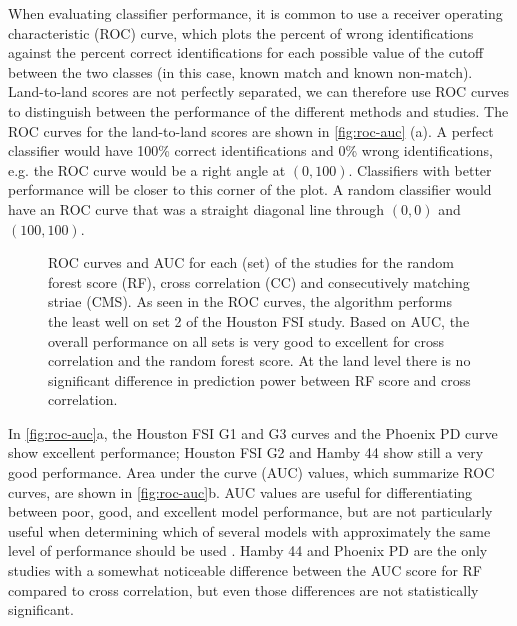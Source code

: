 \documentclass[doubleblind]{elsarticle}\usepackage[]{graphicx}\usepackage[]{color}
\newenvironment{knitrout}{}{} %
\begin{document}
When evaluating classifier performance, it is common to use a receiver operating characteristic (ROC) curve, which plots the percent of wrong identifications against the percent correct identifications for each possible value of the cutoff between the two classes (in this case, known match and known non-match). Land-to-land scores are not perfectly separated, we can therefore use ROC curves to distinguish between the performance of the different methods and studies. The ROC curves for the land-to-land scores are shown in \autoref{fig:roc-auc} (a). A perfect classifier would have 100\% correct identifications and 0\% wrong identifications, e.g. the ROC curve would be a right angle at $(0, 100)$. Classifiers with better performance will be closer to this corner of the plot. A random classifier would have an ROC curve that was a straight diagonal line through $(0,0)$ and $(100,100)$.










\begin{knitrout}
\color{fgcolor}\begin{figure}

{\centering {}

}

\caption[ROC curves and AUC for each (set) of the studies for the random forest score (RF), cross correlation (CC) and consecutively matching striae (CMS)]{ROC curves and AUC for each (set) of the studies for the random forest score (RF), cross correlation (CC) and consecutively matching striae (CMS).   As seen in the ROC curves, the algorithm performs the least well on set 2 of the Houston FSI study. Based on AUC, the overall performance on all sets is very good to excellent for cross correlation and the random forest score. At the land level there is no significant difference in prediction power between RF score and cross correlation.}\label{fig:roc-auc}
\end{figure}


\end{knitrout}

In \autoref{fig:roc-auc}a, the Houston FSI G1 and G3 curves and the Phoenix PD curve show excellent performance; Houston FSI G2 and Hamby 44 show still a very  good performance. Area under the curve (AUC) values, which summarize ROC curves, are shown in \autoref{fig:roc-auc}b. AUC values are useful for differentiating between poor, good, and excellent model performance, but are not particularly useful when determining which of several models with approximately the same level of performance should be used \citep{marzban_roc_2004}. Hamby 44 and Phoenix PD are the only studies with a somewhat noticeable difference between the AUC score for RF compared to cross correlation, but even those differences are not statistically significant.
\end{document}
